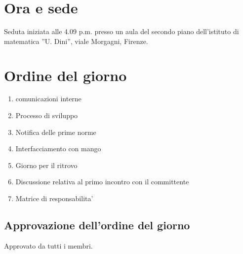 \section*{Ora e sede}
Seduta iniziata alle 4.09 p.m. presso un aula del secondo piano dell'istituto
di matematica ''U. Dini'', viale Morgagni, Firenze.

\section*{Ordine del giorno}
\begin{enumerate}
\item comunicazioni interne
\item Processo di sviluppo
\item Notifica delle prime norme
\item Interfacciamento con mango
\item Giorno per il ritrovo
\item Discussione relativa al primo incontro con il committente
\item Matrice di responsabilita'
\end{enumerate}

\subsection*{Approvazione dell'ordine del giorno}
Approvato da tutti i membri.

